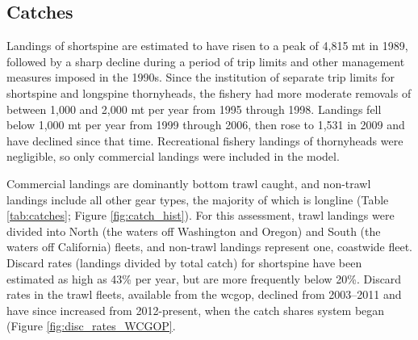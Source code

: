 \documentclass[11pt,
  english,
  letterpaper,
]{article}
\begin{document}
\hypertarget{catches}{%
\subsection*{Catches}\label{catches}}

Landings of shortspine are estimated to have risen to a peak of 4,815 mt in 1989, followed by a sharp decline during a period of trip limits and other management measures imposed in the 1990s. Since the institution of separate trip limits for shortspine and longspine thornyheads, the fishery had more moderate removals of between 1,000 and 2,000 mt per year from 1995 through 1998. Landings fell below 1,000 mt per year from 1999 through 2006, then rose to 1,531 in 2009 and have declined since that time. Recreational fishery landings of thornyheads were negligible, so only commercial landings were included in the model.

Commercial landings are dominantly bottom trawl caught, and non-trawl landings include all other gear types, the majority of which is longline (Table \ref{tab:catches}; Figure \ref{fig:catch_hist}). For this assessment, trawl landings were divided into North (the waters off Washington and Oregon) and South (the waters off California) fleets, and non-trawl landings represent one, coastwide fleet. Discard rates (landings divided by total catch) for shortspine have been estimated as high as 43\% per year, but are more frequently below 20\%. Discard rates in the trawl fleets, available from the \gls{wcgop}, declined from 2003--2011 and have since increased from 2012-present, when the catch shares system began (Figure \ref{fig:disc_rates_WCGOP}.

\begingroup\fontsize{10}{12}\selectfont
\begingroup\fontsize{10}{12}\selectfont
\end{document}
